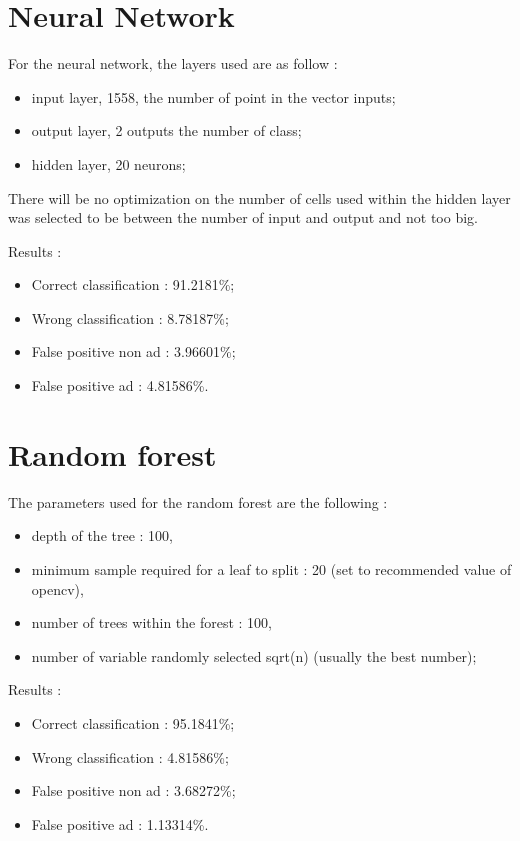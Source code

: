 \section{Neural Network}
For the neural network, the layers used are as follow :
  \begin{itemize}
    \item input layer, 1558, the number of point in the vector inputs;
    \item output layer, 2 outputs the number of class;
    \item hidden layer, 20 neurons;
  \end{itemize}
  There will be no optimization on the number of cells used within the hidden layer was selected to be between the number of input and output and not too big.

  Results :
  \begin{itemize}
    \item Correct classification : 91.2181\%;
    \item Wrong classification : 8.78187\%;
    \item False positive non ad : 3.96601\%;
    \item False positive ad : 4.81586\%.
  \end{itemize}


\section{Random forest}
The parameters used for the random forest are the following :
  \begin{itemize}
      \item depth of the tree : 100,
      \item minimum sample required for a leaf to split : 20 (set to recommended value of opencv),
      \item number of trees within the forest : 100,
      \item number of variable randomly selected sqrt(n) (usually the best number);
  \end{itemize}
  
Results :
\begin{itemize}
  \item Correct classification : 95.1841\%;
  \item Wrong classification : 4.81586\%;
  \item False positive non ad : 3.68272\%;
  \item False positive ad : 1.13314\%.
\end{itemize}
